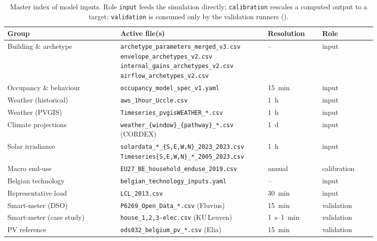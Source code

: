 \begin{table}[ht]
  \centering
  \footnotesize
  \caption{Master index of model inputs. Role \texttt{input} feeds the simulation directly; \texttt{calibration} rescales a computed output to a target; \texttt{validation} is consumed only by the validation runners ().}
  \label{tab:inputs_overview}
  \begin{tabular}{@{}p{0.27\linewidth} p{0.34\linewidth}
                    p{0.13\linewidth} p{0.13\linewidth}@{}}
    \toprule
    \textbf{Group} & \textbf{Active file(s)} &
    \textbf{Resolution} & \textbf{Role} \\
    \midrule
    Building \& archetype
      & \texttt{archetype\_parameters\_merged\_v3.csv}\newline
        \texttt{envelope\_archetypes\_v2.csv}\newline
        \texttt{internal\_gains\_archetypes\_v2.csv}\newline
        \texttt{airflow\_archetypes\_v2.csv}
      & --
      & input \\
    Occupancy \& behaviour
      & \texttt{occupancy\_model\_spec\_v1.yaml}
      & \SI{15}{min}
      & input \\
    Weather (historical)
      & \texttt{aws\_1hour\_Uccle.csv}
      & \SI{1}{h}
      & input \\
    Weather (PVGIS)
      & \texttt{Timeseries\_pvgisWEATHER\_*.csv}
      & \SI{1}{h}
      & input \\
    Climate projections
      & \texttt{weather\_\{window\}\_\{pathway\}\_*.csv} (CORDEX)
      & \SI{1}{d}
      & input \\
    Solar irradiance
      & \texttt{solardata\_*\_\{S,E,W,N\}\_2023\_2023.csv}\newline
        \texttt{Timeseries\{S,E,W,N\}\_*\_2005\_2023.csv}
      & \SI{1}{h}
      & input \\
    Macro end-use
      & \texttt{EU27\_BE\_household\_enduse\_2019.csv}
      & annual
      & calibration \\
    Belgian technology
      & \texttt{belgian\_technology\_inputs.yaml}
      & --
      & input \\
    Representative load
      & \texttt{LCL\_2013.csv}
      & \SI{30}{min}
      & input \\
    Smart-meter (DSO)
      & \texttt{P6269\_Open\_Data\_*.csv} (Fluvius)
      & \SI{15}{min}
      & validation \\
    Smart-meter (case study)
      & \texttt{house\_1,2,3-elec.csv} (KU\,Leuven)
      & \SI{1}{s}--\SI{1}{min}
      & validation \\
    PV reference
      & \texttt{ods032\_belgium\_pv\_*.csv} (Elia)
      & \SI{15}{min}
      & validation \\
    \bottomrule
  \end{tabular}
\end{table}


